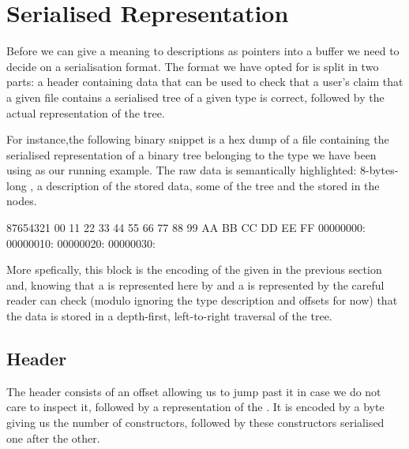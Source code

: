 \section{Serialised Representation}\label{sec:hexdump}

Before we can give a meaning to descriptions as pointers into a buffer we
need to decide on a serialisation format.
%
The format we have opted for is split in two parts: a header containing
data that can be used to check that a user's claim that a given file
contains a serialised tree of a given type is correct, followed by the
actual representation of the tree.


For instance,the following binary snippet is a hex dump of a file
containing the serialised representation of a binary tree belonging to
the type we have been using as our running example.
%
The raw data is semantically highlighted:
8-bytes-long ,
a  description of the stored data,
some  of the tree
and the  stored in the nodes.

\begin{hexdump}
87654321  00 11 22 33 44 55 66 77 88 99 AA BB CC DD EE FF
00000000:   
00000010:   
00000020:         
00000030:     
\end{hexdump}

More spefically, this block is the encoding of the 
given in the previous section and,
%
knowing that a  is represented here by 
and a  is represented by 
%
the careful reader can check
(modulo ignoring the type description and offsets for now)
that the data is stored in a depth-first, left-to-right traversal of the tree.


\subsection{Header}

The header consists of an offset allowing us to jump past it in case we do
not care to inspect it, followed by a representation of the .
%
It is encoded by a byte giving us the number of constructors, followed by
these constructors serialised one after the other.

